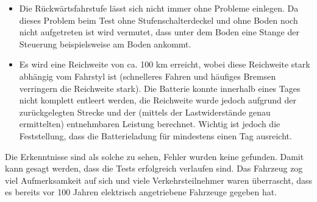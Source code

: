 \begin{itemize}
	\item Die Rückwärtsfahrstufe lässt sich nicht immer ohne Probleme einlegen. Da dieses Problem beim Test ohne Stufenschalterdeckel und ohne Boden noch nicht aufgetreten ist wird vermutet, dass unter dem Boden eine Stange der Steuerung beispielsweise am Boden ankommt.
	\item Es wird eine Reichweite von ca. 100 km erreicht, wobei diese Reichweite stark abhängig vom Fahrstyl ist (schnelleres Fahren und häufiges Bremsen verringern die Reichweite stark). Die Batterie konnte innerhalb eines Tages nicht komplett entleert werden, die Reichweite wurde jedoch aufgrund der zurückgelegten Strecke und der (mittels der Lastwiderstände genau ermittelten) entnehmbaren Leistung berechnet. Wichtig ist jedoch die Feststellung, dass die Batterieladung für mindestens einen Tag ausreicht.
\end{itemize}

Die Erkenntnisse sind als solche zu sehen, Fehler wurden keine gefunden. Damit kann gesagt werden, dass die Tests erfolgreich verlaufen sind. Das Fahrzeug zog viel Aufmerksamkeit auf sich und viele Verkehrsteilnehmer waren überrascht, dass es bereits vor 100 Jahren elektrisch angetriebene Fahrzeuge gegeben hat.

\newpage
\color{black}